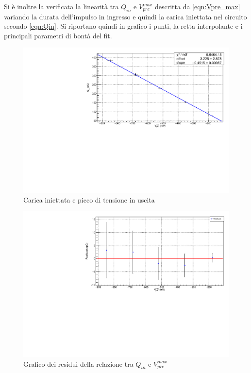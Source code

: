 \documentclass{article}
\begin{document}
Si è inoltre la verificata la linearità tra $Q_{in}$ e $V_{pre}^{max}$ descritta da \ref{eqn:Vpre_max} variando la durata dell'impulso
in ingresso e quindi la carica iniettata nel circuito secondo \ref{eqn:Qin}. Si riportano quindi in grafico i punti, la retta 
interpolante e i principali parametri di bontà del fit. 

\begin{center}
\begin{figure}[H]
\centering
\includegraphics[scale=0.4, angle=0]{fitpreamp.pdf}
\caption{ Carica iniettata e picco di tensione in uscita}
\label{fig:QinvsVpre}
\end{figure}
\end{center}

\begin{center}
\begin{figure}[H]
\centering
\includegraphics[scale=0.4, angle=0]{residuipreamp.pdf}
\caption{Grafico dei residui della relazione tra $Q_{in}$ e $V_{pre}^{max}$}
\label{fig:QinvsVpre_res}
\end{figure}
\end{center}
\end{document}

